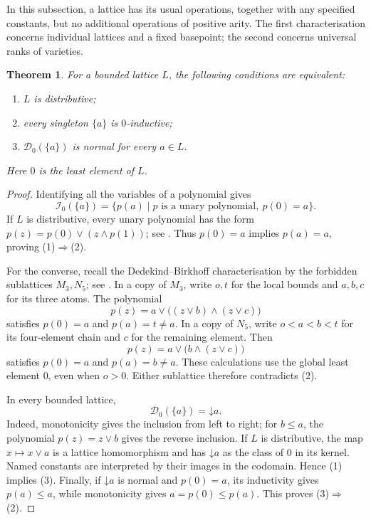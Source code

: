\documentclass[12pt,english]{amsart}
\newtheorem{theorem}{Theorem}[section]
\theoremstyle{definition}
\numberwithin{equation}{section}
\theoremstyle{remark}
\begin{document}
In this subsection, a lattice has its usual operations, together with
any specified constants, but no additional operations of positive arity.
The first characterisation concerns individual lattices and a fixed
basepoint; the second concerns universal ranks of varieties.

\begin{theorem}\label{DetThmLatticeSingletons}
For a bounded lattice $L$, the following conditions are equivalent:
\begin{enumerate}
\item $L$ is distributive;
\item every singleton $\{a\}$ is $0$-inductive;
\item $\mathcal D_0(\{a\})$ is normal for every $a\in L$.
\end{enumerate}
Here $0$ is the least element of $L$.
\end{theorem}

\begin{proof}
Identifying all the variables of a polynomial gives
\[
\mathcal I_0(\{a\})
=\{p(a)\mid p\text{ is a unary polynomial},\ p(0)=a\}.
\]
If $L$ is distributive, every unary polynomial has the form
$p(z)=p(0)\vee(z\wedge p(1))$; see
\cite[Propositions 8 and 10]{DetCM12}. Thus $p(0)=a$ implies $p(a)=a$,
proving (1)$\Rightarrow$(2).

For the converse, recall the Dedekind--Birkhoff characterisation by
the forbidden sublattices $M_3,N_5$; see
\cite[Theorem 1]{DetLS17}. In a copy of $M_3$, write $o,t$ for the local
bounds and $a,b,c$ for its three atoms. The polynomial
\[
p(z)=a\vee\bigl((z\vee b)\wedge(z\vee c)\bigr)
\]
satisfies $p(0)=a$ and $p(a)=t\ne a$. In a copy of $N_5$, write
$o<a<b<t$ for its four-element chain and $c$ for the remaining element.
Then
\[
p(z)=a\vee\bigl(b\wedge(z\vee c)\bigr)
\]
satisfies $p(0)=a$ and $p(a)=b\ne a$. These calculations use the global
least element $0$, even when $o>0$. Either sublattice therefore
contradicts (2).

In every bounded lattice,
\begin{equation}\label{DetEqLatticeDeductionSingleton}
\mathcal D_0(\{a\})=\mathord\downarrow a.
\end{equation}
Indeed, monotonicity gives the inclusion from left to right; for
$b\leqslant a$, the polynomial $p(z)=z\vee b$ gives the reverse
inclusion. If $L$ is distributive, the map $x\mapsto x\vee a$ is a
lattice homomorphism and has $\mathord\downarrow a$ as the class of
$0$ in its kernel. Named constants are interpreted by their images in
the codomain. Hence (1) implies (3). Finally, if
$\mathord\downarrow a$ is normal and $p(0)=a$, its inductivity gives
$p(a)\leqslant a$, while monotonicity gives $a=p(0)\leqslant p(a)$.
This proves (3)$\Rightarrow$(2).
\end{proof}
\end{document}
